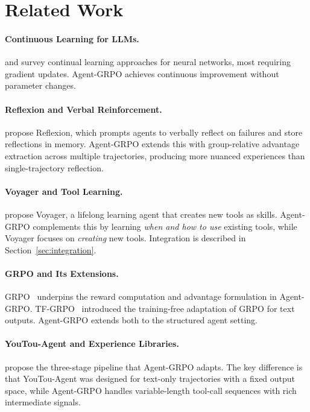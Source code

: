\section{Related Work}

\label{sec:related}

\paragraph{Continuous Learning for LLMs.}
\cite{mitchell2022memory} and \cite{de2021continual} survey continual
learning approaches for neural networks, most requiring gradient updates.
Agent-GRPO achieves continuous improvement without parameter changes.

\paragraph{Reflexion and Verbal Reinforcement.}
\cite{shinn2023reflexion} propose Reflexion, which prompts agents to verbally
reflect on failures and store reflections in memory. Agent-GRPO extends this
with group-relative advantage extraction across multiple trajectories,
producing more nuanced experiences than single-trajectory reflection.

\paragraph{Voyager and Tool Learning.}
\cite{wang2023voyager} propose Voyager, a lifelong learning agent that
creates new tools as skills. Agent-GRPO complements this by learning
\emph{when and how to use} existing tools, while Voyager focuses on
\emph{creating} new tools. Integration is described in Section~\ref{sec:integration}.

\paragraph{GRPO and Its Extensions.}
GRPO~\cite{shao2024deepseekmath} underpins the reward computation and
advantage formulation in Agent-GRPO. TF-GRPO~\cite{hanzo2026aso} introduced
the training-free adaptation of GRPO for text outputs. Agent-GRPO extends
both to the structured agent setting.

\paragraph{YouTou-Agent and Experience Libraries.}
\cite{tencent2025youtoagent} propose the three-stage pipeline that
Agent-GRPO adapts. The key difference is that YouTou-Agent was designed for
text-only trajectories with a fixed output space, while Agent-GRPO handles
variable-length tool-call sequences with rich intermediate signals.

